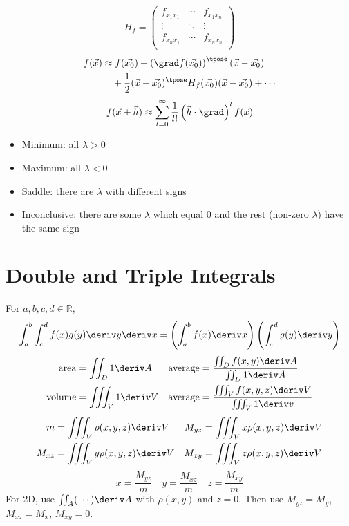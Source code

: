 \documentclass[10pt, a4paper]{article}
\begin{document}
\begin{landscape}
\begin{multicols}{3}
    \[H_{f} = \begin{pmatrix}
        f_{x_{1} x_{1}} & \cdots & f_{x_{1} x_{n}} \\ 
        \vdots & \ddots & \vdots \\ 
        f_{x_{n} x_{1}} & \cdots & f_{x_{n} x_{n}} \\ 
    \end{pmatrix}\]
    \begin{align*}
        f(\vec{x}) &\approx f(\vec{x_0}) + \left(\grad f (\vec{x_0})\right)^{\tpose} (\vec{x} - \vec{x_0}) \\
        &\quad + \frac{1}{2} (\vec{x} - \vec{x_0})^{\tpose} H_{f}(\vec{x_0}) (\vec{x} - \vec{x_0}) + \cdots
    \end{align*}
    \[
        f(\vec{x} + \vec{h}) \approx \sum_{l=0}^{\infty} \frac{1}{l!} \left(\vec{h} \cdot \grad\right)^{l} f(\vec{x})
    \]
    \begin{itemize}
        \item Minimum: all \(\lambda > 0\)
        \item Maximum: all \(\lambda < 0\)
        \item Saddle: there are \(\lambda\) with different signs
        \item Inconclusive: there are some \(\lambda\) which equal 0 and the rest (non-zero \(\lambda\)) have the same sign
    \end{itemize}

    \section{Double and Triple Integrals}

    For \(a, b, c, d \in \mathbb{R}\),
    \[
        \int_{a}^{b} \int_{c}^{d} f(x) g(y) \deriv y \deriv x
        = \left(\int_{a}^{b} f(x) \deriv x\right) \left(\int_{c}^{d} g(y) \deriv y\right)
    \]
    \begin{align*}
        \mathrm{area} &= \iint_{D} 1 \deriv A  &
        \mathrm{average} &= \frac{\iint_{D} f(x, y) \deriv A}{\iint_{D} 1 \deriv A} \\
        \mathrm{volume} &= \iiint_{V} 1 \deriv V  &
        \mathrm{average} &= \frac{\iiint_{V} f(x, y, z) \deriv V}{\iiint_{V} 1 \deriv v}
    \end{align*}
    \begin{align*}
        m &= \iiint_V \rho(x, y, z) \deriv V  &  M_{yz} &= \iiint_V x \rho(x, y, z) \deriv V \\
        M_{xz} &= \iiint_V y \rho(x, y, z) \deriv V  &  M_{xy} &= \iiint_V z \rho(x, y, z) \deriv V
    \end{align*}
    \[\bar x = \frac{M_{yz}}{m} \quad \bar y = \frac{M_{xz}}{m} \quad \bar z = \frac{M_{xy}}{m}\]
    For 2D, use \(\iint_{A} (\cdots) \deriv A\) with \(\rho(x, y)\) and \(z = 0\). Then use
    \(M_{yz} = M_y\), \(M_{xz} = M_x\), \(M_{xy} = 0\).


\end{multicols}
\end{landscape}
\end{document}
